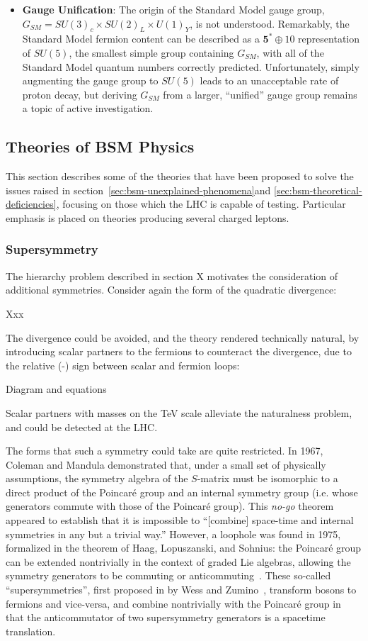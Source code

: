 \begin{itemize}
	\item \textbf{Gauge Unification}: The origin of the Standard Model gauge group, $G_{SM}=SU(3)_c\times SU(2)_L \times U(1)_Y$, is not understood. Remarkably, the Standard Model fermion content can be described as a $\mathbf{5}^{*}\oplus 10$ representation of $SU(5)$, the smallest simple group containing $G_{SM}$, with all of the Standard Model quantum numbers correctly predicted. Unfortunately, simply augmenting the gauge group to $SU(5)$ leads to an unacceptable rate of proton decay, but deriving $G_{SM}$ from a larger, ``unified'' gauge group remains a topic of active investigation.  
\end{itemize}

\subsection{Theories of BSM Physics}\label{sec:bsm-theories}
This section describes some of the theories that have been proposed to solve the issues raised in section~\ref{sec:bsm-unexplained-phenomena}and \ref{sec:bsm-theoretical-deficiencies}, focusing on those which the LHC is capable of testing. Particular emphasis is placed on theories producing several charged leptons. 

\subsubsection{Supersymmetry}
The hierarchy problem described in section X motivates the consideration of additional symmetries. Consider again the form of the quadratic divergence:

Xxx

The divergence could be avoided, and the theory rendered technically natural, by introducing scalar partners to the fermions to counteract the divergence, due to the relative  (-) sign between scalar and fermion loops:

Diagram and equations

Scalar partners with masses on the TeV scale alleviate the naturalness problem, and could be detected at the LHC.

The forms that such a symmetry could take are quite restricted. In 1967, Coleman and Mandula demonstrated that, under a small set of physically assumptions, the symmetry algebra of the $S$-matrix must be isomorphic to a direct product of the Poincar\'{e} group and an internal symmetry group (i.e. whose generators commute with those of the Poincar\'{e} group). This \emph{no-go} theorem appeared to establish that it is impossible to ``[combine] space-time and internal symmetries in any but a trivial way.'' However, a loophole was found in 1975, formalized in the theorem of Haag, Lopuszanski, and Sohnius: the Poincar\'{e} group can be extended nontrivially in the context of graded Lie algebras, allowing the symmetry generators to be commuting or anticommuting~\cite{Haag1975257}. These so-called ``supersymmetries'', first proposed in by Wess and Zumino~\cite{Wess197439}, transform bosons to fermions and vice-versa, and combine nontrivially with the Poincar\'{e} group in that the anticommutator of two supersymmetry generators is a spacetime translation. 

